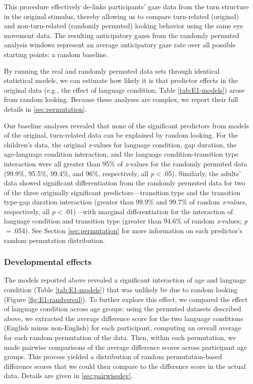 \documentclass[authoryear, 12pt]{elsarticle}
\begin{document}
This procedure effectively de-links participants' gaze data from the turn structure in the original stimulus, thereby allowing us to compare turn-related (original) and non-turn-related (randomly permuted) looking behavior using the same eye movement data. The resulting anticipatory gazes from the randomly permuted analysis windows represent an average anticipatory gaze rate over all possible starting points: a random baseline.

By running the real and randomly permuted data sets through identical statistical models, we can estimate how likely it is that predictor effects in the original data (e.g., the effect of language condition; Table \ref{tab:E1-models}) arose from random looking. Because these analyses are complex, we report their full details in \ref{sec:permutation}. 

Our baseline analyses revealed that none of the significant predictors from models of the original, turn-related data can be explained by random looking. For the children's data, the original \textit{z}-values for language condition, gap duration, the age-language condition interaction, and the language condition-transition type interaction were all greater than 95\% of \textit{z}-values for the randomly permuted data (99.9\%, 95.5\%, 99.4\%, and 96\%, respectively, all \textit{p}$<$.05). Similarly, the adults' data showed significant differentiation from the randomly permuted data for two of the three originally significant predictors---transition type and the transition type-gap duration interaction (greater than 99.9\% and 99.7\% of random \textit{z}-values, respectively, all \textit{p}$<$.01)---with marginal differentiation for the interaction of language condition and transition type (greater than 94.6\% of random \textit{z}-values; \textit{p}$=$.054). See Section \ref{sec:permutation} for more information on each predictor's random permutation distribution.

\subsubsection{Developmental effects}

The models reported above revealed a significant interaction of age and language condition (Table \ref{tab:E1-models}) that was unlikely be due to random looking (Figure \ref{fig:E1-randvsreal}). To further explore this effect, we compared the effect of language condition across age groups: using the permuted datasets described above, we extracted the average difference score for the two language conditions (English minus non-English) for each participant, computing an overall average for each random permutation of the data. Then, within each permutation, we made pairwise comparisons of the average difference scores across participant age groups. This process yielded a distribution of random permutation-based difference scores that we could then compare to the difference score in the actual data. Details are given in \ref{sec:pairwisedev}.
\end{document}
